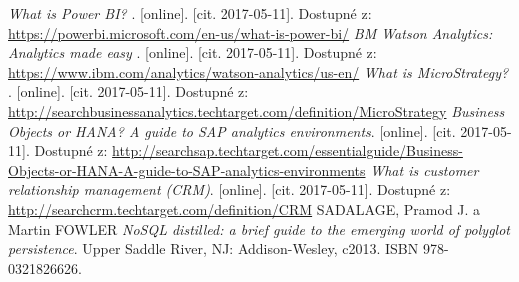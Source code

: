 \begin{thebibliography}{99}
\textit{What is Power BI? }.
[online]. [cit. 2017-05-11]. Dostupné z:  \url{https://powerbi.microsoft.com/en-us/what-is-power-bi/}
\textit{BM Watson Analytics: Analytics made easy }.
[online]. [cit. 2017-05-11]. Dostupné z: \url{https://www.ibm.com/analytics/watson-analytics/us-en/}
\textit{What is MicroStrategy? }.
[online]. [cit. 2017-05-11]. Dostupné z: \url{http://searchbusinessanalytics.techtarget.com/definition/MicroStrategy}
\textit{Business Objects or HANA? A guide to SAP analytics environments}.
[online]. [cit. 2017-05-11]. Dostupné z: \url{http://searchsap.techtarget.com/essentialguide/Business-Objects-or-HANA-A-guide-to-SAP-analytics-environments}
\textit{What is customer relationship management (CRM)}.
[online]. [cit. 2017-05-11]. Dostupné z: \url{http://searchcrm.techtarget.com/definition/CRM}
SADALAGE, Pramod J. a Martin FOWLER
\textit{NoSQL distilled: a brief guide to the emerging world of polyglot persistence}.
Upper Saddle River, NJ: Addison-Wesley, c2013. ISBN 978-0321826626.
\label{LastPage}
\end{thebibliography}
